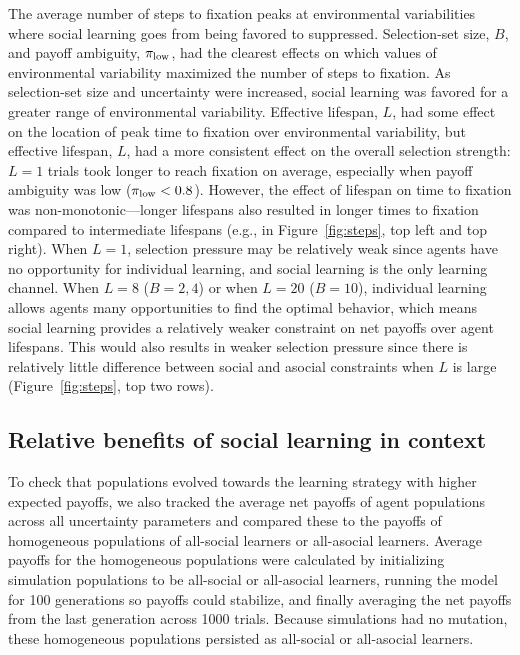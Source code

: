 \documentclass[letterpaper,11.5pt]{scrartcl}
\begin{document}
The average number of steps to fixation peaks at environmental variabilities 
where social learning goes from being favored to suppressed. 
Selection-set size, $B$, 
and payoff ambiguity, $\pi_{\mathrm{low}}$, 
had the clearest effects on which values of environmental variability maximized
the number of steps to fixation. As selection-set size and uncertainty were increased, 
social learning was favored for a greater range of environmental variability. 
Effective lifespan, $L$, 
had some effect on the location of peak time to fixation over environmental variability, 
but effective lifespan, $L$, had a more consistent effect on the
overall selection strength: $L=1$ trials took longer to reach fixation on average, 
especially when payoff ambiguity 
was low ($\pi_{\mathrm{low}} < 0.8$). However, the effect of lifespan on time to fixation was non-monotonic---longer
lifespans also resulted in longer times to fixation compared to intermediate lifespans (e.g., in
Figure~\ref{fig:steps}, top left and top right). When $L=1$, selection pressure may be relatively
weak since agents have no opportunity for individual learning, and social learning is the only
learning channel. When $L=8$ ($B=2,4$) or when $L=20$ ($B=10$), individual learning allows agents
many opportunities to find the optimal behavior, which means social learning provides a relatively
weaker constraint on net payoffs over agent lifespans. This would also results in weaker selection pressure since there is relatively little difference between social and asocial constraints when $L$ is large
(Figure~\ref{fig:steps}, top two rows).

\subsection{Relative benefits of social learning in context}

To check that populations evolved towards the learning strategy with higher expected payoffs, we also tracked the average net payoffs of agent populations across
all uncertainty parameters and compared these to the payoffs of homogeneous populations of all-social learners or all-asocial
learners. Average payoffs for the homogeneous populations were calculated by initializing simulation populations to be all-social or
all-asocial learners, running the model for 100 generations so payoffs could stabilize, and finally averaging the net payoffs from
the last generation across 1000 trials. Because simulations had no mutation, these homogeneous populations persisted as all-social
or all-asocial learners.
\end{document}
